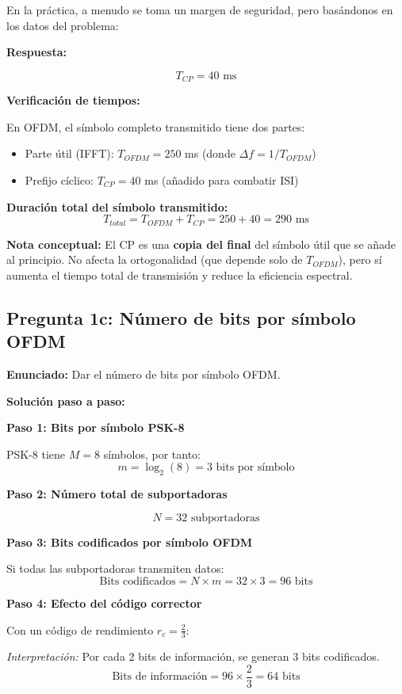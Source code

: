 \documentclass[11pt,a4paper]{article}
\begin{document}
En la práctica, a menudo se toma un margen de seguridad, pero basándonos en los datos del problema:

\textbf{Respuesta:}

\[
\boxed{T_{CP} = 40 \text{ ms}}
\]

\textbf{Verificación de tiempos:}

En OFDM, el símbolo completo transmitido tiene dos partes:
\begin{itemize}
    \item Parte útil (IFFT): $T_{OFDM} = 250$ ms (donde $\Delta f = 1/T_{OFDM}$)
    \item Prefijo cíclico: $T_{CP} = 40$ ms (añadido para combatir ISI)
\end{itemize}

\textbf{Duración total del símbolo transmitido:}
\[
T_{total} = T_{OFDM} + T_{CP} = 250 + 40 = 290 \text{ ms}
\]

\textbf{Nota conceptual:} El CP es una \textbf{copia del final} del símbolo útil que se añade al principio. No afecta la ortogonalidad (que depende solo de $T_{OFDM}$), pero sí aumenta el tiempo total de transmisión y reduce la eficiencia espectral.

\subsection*{Pregunta 1c: Número de bits por símbolo OFDM}

\textbf{Enunciado:} Dar el número de bits por símbolo OFDM.

\vspace{0.3cm}
\textbf{Solución paso a paso:}

\textbf{Paso 1: Bits por símbolo PSK-8}

PSK-8 tiene $M = 8$ símbolos, por tanto:
\[
m = \log_2(8) = 3 \text{ bits por símbolo}
\]

\textbf{Paso 2: Número total de subportadoras}

\[
N = 32 \text{ subportadoras}
\]

\textbf{Paso 3: Bits codificados por símbolo OFDM}

Si todas las subportadoras transmiten datos:
\[
\text{Bits codificados} = N \times m = 32 \times 3 = 96 \text{ bits}
\]

\textbf{Paso 4: Efecto del código corrector}

Con un código de rendimiento $r_c = \frac{2}{3}$:

\textit{Interpretación:} Por cada 2 bits de información, se generan 3 bits codificados.
\[
\text{Bits de información} = 96 \times \frac{2}{3} = 64 \text{ bits}
\]
\end{document}
